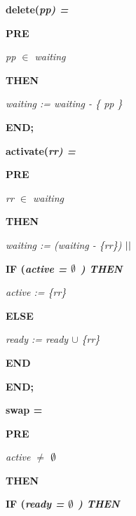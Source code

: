 \documentclass[11pt]{article}
\begin{document}
\begin{sloppypar}
\bf delete\rm (\it pp\rm ) \rm =

\hspace*{0.20in}\bf PRE

\hspace*{0.40in}\it pp  $\in$  \it waiting 

\hspace*{0.20in}\bf THEN

\hspace*{0.40in}\it waiting \rm := \it waiting \rm - \rm \{ \it pp \rm \}

\hspace*{0.20in}\bf END\rm ;\hspace*{0.20in}

\bf activate\rm (\it rr\rm ) \rm =

\hspace*{0.40in}\bf PRE

\hspace*{0.80in}\it rr  $\in$  \it waiting

\hspace*{0.40in}\bf THEN

\hspace*{0.80in}\it waiting \rm := \rm (\it waiting \rm - \rm \{\it rr\rm \}\rm )  $\mbox{$\mid\mid$}$ 

\hspace*{0.80in}\bf IF \rm (\it active \rm =  $\emptyset$ \rm ) \bf THEN

\hspace*{0.95in}\it active \rm := \rm \{\it rr\rm \}

\hspace*{0.80in}\bf ELSE

\hspace*{0.95in}\it ready \rm := \it ready  $\cup$  \rm \{\it rr\rm \} 

\hspace*{0.80in}\bf END

\hspace*{0.40in}\bf END\rm ;\hspace*{0.45in}

\bf swap \rm =

\hspace*{0.40in}\bf PRE

\hspace*{0.80in}\it active  $\not =$   $\emptyset$ 

\hspace*{0.40in}\bf THEN

\hspace*{0.80in}\bf IF \rm (\it ready \rm =  $\emptyset$ \rm ) \bf THEN


\end{sloppypar}
\end{document}
